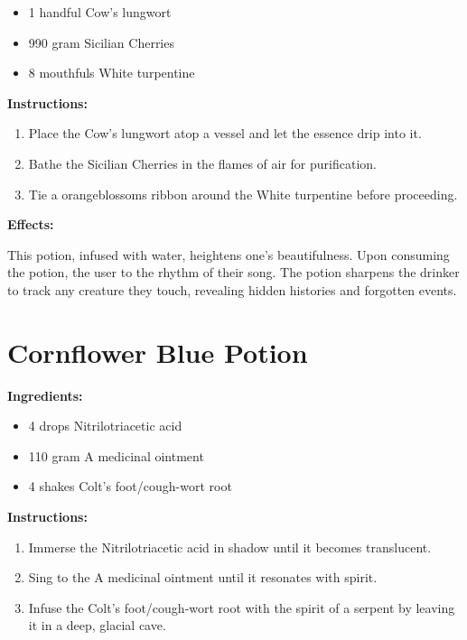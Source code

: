 \documentclass{article}
\begin{document}
\begin{itemize}
  \item 1 handful Cow's lungwort
  \item 990 gram Sicilian Cherries
  \item 8 mouthfuls White turpentine
\end{itemize}

\textbf{Instructions:}

\begin{enumerate}
  \item Place the Cow's lungwort atop a vessel and let the essence drip into it.
  \item Bathe the Sicilian Cherries in the flames of air for purification.
  \item Tie a orangeblossoms ribbon around the White turpentine before proceeding.
\end{enumerate}

\textbf{Effects:}

This potion, infused with water, heightens one's beautifulness. Upon consuming the potion, the user to the rhythm of their song. The potion sharpens the drinker to track any creature they touch, revealing hidden histories and forgotten events.

\newpage
\section*{Cornflower Blue Potion}

\textbf{Ingredients:}

\begin{itemize}
  \item 4 drops Nitrilotriacetic acid
  \item 110 gram A medicinal ointment
  \item 4 shakes Colt's foot/cough-wort root
\end{itemize}

\textbf{Instructions:}

\begin{enumerate}
  \item Immerse the Nitrilotriacetic acid in shadow until it becomes translucent.
  \item Sing to the A medicinal ointment until it resonates with spirit.
  \item Infuse the Colt's foot/cough-wort root with the spirit of a serpent by leaving it in a deep, glacial cave.
\end{enumerate}
\end{document}
